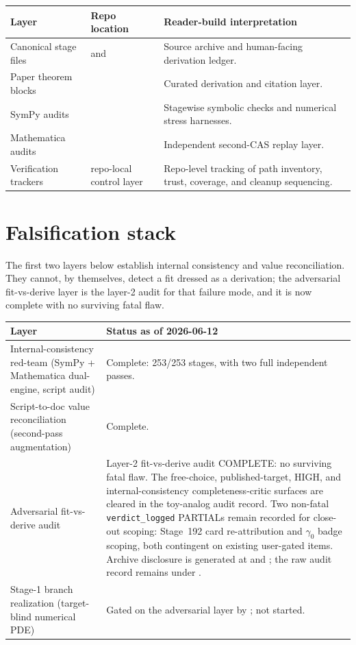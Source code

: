 \begin{longtable}{L{0.24\textwidth}L{0.26\textwidth}L{0.40\textwidth}}
\toprule
Layer & Repo location & Reader-build interpretation \\
\midrule
\endhead
Canonical stage files &  and
 & Source archive and
human-facing derivation ledger. \\
\addlinespace
Paper theorem blocks &  & Curated
derivation and citation layer. \\
\addlinespace
SymPy audits &  & Stagewise symbolic
checks and numerical stress harnesses. \\
\addlinespace
Mathematica audits & 
& Independent second-CAS replay layer. \\
\addlinespace
Verification trackers & repo-local control layer & Repo-level tracking of path
inventory, trust, coverage, and cleanup sequencing. \\
\bottomrule
\end{longtable}

\section{Falsification stack}

The first two layers below establish internal consistency and value
reconciliation.  They cannot, by themselves, detect a fit dressed as a
derivation; the adversarial fit-vs-derive layer is the layer-2 audit for that
failure mode, and it is now complete with no surviving fatal flaw.

\begin{longtable}{L{0.38\textwidth}L{0.52\textwidth}}
\toprule
Layer & Status as of 2026-06-12 \\
\midrule
\endhead
Internal-consistency red-team (SymPy + Mathematica dual-engine, script audit) &
Complete: 253/253 stages, with two full independent passes. \\
\addlinespace
Script-to-doc value reconciliation (second-pass augmentation) & Complete. \\
\addlinespace
Adversarial fit-vs-derive audit & Layer-2 fit-vs-derive audit COMPLETE:
no surviving fatal flaw.  The free-choice, published-target, HIGH, and
internal-consistency completeness-critic surfaces are cleared in the
toy-analog audit record.  Two non-fatal \texttt{verdict\_logged} PARTIALs
remain recorded for close-out scoping: Stage~192 card re-attribution and
\(\gamma_0\) badge scoping, both contingent on existing user-gated items.
Archive disclosure is generated at
 and
; the raw audit
record remains under . \\
\addlinespace
Stage-1 branch realization (target-blind numerical PDE) & Gated on the
adversarial layer by ;
not started. \\
\bottomrule
\end{longtable}

